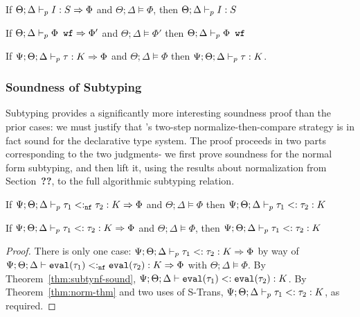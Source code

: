 \begin{theorem}
If $\Theta;\Delta \vdash_p I : S \Rightarrow \Phi$ and $\Theta;\Delta \vDash \Phi$, then $\Theta;\Delta \vdash_p I : S$ 
\label{thm:sort-sound}
\end{theorem}

\begin{theorem}
If $\Theta ; \Delta \vdash_p \Phi \texttt{ wf} \Rightarrow \Phi'$ and $\Theta ; \Delta \vDash \Phi'$ then $\Theta ; \Delta \vdash_p \Phi \texttt{ wf}$
\label{thm:constr-sound}
\end{theorem}

\begin{theorem}
If $\Psi ; \Theta ; \Delta \vdash_p \tau : K \Rightarrow \Phi$ and $\Theta ; \Delta \vDash \Phi$ then $\Psi ; \Theta ; \Delta \vdash_p \tau : K$.
\label{thm:kind-sound}
\end{theorem}

\subsubsection{Soundness of Subtyping}
Subtyping provides a significantly more interesting soundness proof than the prior cases: we must justify that \bilambdaamor's two-step normalize-then-compare strategy is in fact sound for the declarative type system. The proof proceeds in two parts corresponding to the two judgments- we first prove soundness for the normal form subtyping, and then lift it, using the results about normalization from Section~\textbf{??}, to the full algorithmic subtyping relation.

\begin{theorem}
If $\Psi ; \Theta ; \Delta \vdash_p \tau_1 <:_{\texttt{nf}} \tau_2 : K \Rightarrow \Phi$ and $\Theta ; \Delta \vDash \Phi$ then $\Psi ; \Theta ; \Delta \vdash_p \tau_1 <: \tau_2 : K$
\label{thm:subtynf-sound}
\end{theorem}

\begin{theorem}
If $\Psi ; \Theta ; \Delta \vdash_p \tau_1 <:\tau_2 : K \Rightarrow \Phi$ and $\Theta ; \Delta \vDash \Phi$, then $\Psi ; \Theta ; \Delta \vdash_p \tau_1 <: \tau_2 : K$
\label{thm:subty-sound}
\end{theorem}
\begin{proof}
There is only one case: $\Psi ; \Theta ; \Delta \vdash_p \tau_1 <:\tau_2 : K \Rightarrow \Phi$ by way of $\Psi ; \Theta ; \Delta \vdash \texttt{eval}(\tau_1) <:_{\texttt{nf}} \texttt{eval}(\tau_2) : K \Rightarrow \Phi$ with $\Theta ; \Delta \vDash \Phi$. By Theorem~\ref{thm:subtynf-sound}, $\Psi ; \Theta ; \Delta \vdash \texttt{eval}(\tau_1) <: \texttt{eval}(\tau_2) : K$. By Theorem~\ref{thm:norm-thm} and two uses of S-Trans, $\Psi ; \Theta ; \Delta \vdash_p \tau_1 <: \tau_2 : K$, as required.
\end{proof}

